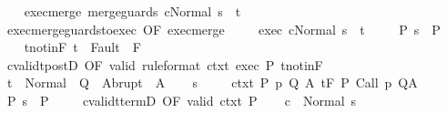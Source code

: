 \begin{isabellebody}
\ \ \isamarkupfalse%
\ exec{\isacharunderscore}merge{\isacharcolon}\ {\isachardoublequoteopen}{\isasymGamma}{\isasymturnstile}{\isasymlangle}merge{\isacharunderscore}guards\ c{\isacharcomma}Normal\ s{\isasymrangle}\ {\isasymRightarrow}\ t{\isachardoublequoteclose}\isanewline
\ \ \isamarkupfalse%
\ exec{\isacharunderscore}merge{\isacharunderscore}guards{\isacharunderscore}to{\isacharunderscore}exec\ {\isacharbrackleft}OF\ exec{\isacharunderscore}merge{\isacharbrackright}\ \isanewline
\ \ \isamarkupfalse%
\ exec{\isacharcolon}\ {\isachardoublequoteopen}{\isasymGamma}{\isasymturnstile}{\isasymlangle}c{\isacharcomma}Normal\ s{\isasymrangle}\ {\isasymRightarrow}\ t{\isachardoublequoteclose}\ \isacommand{{\isachardot}}\isamarkupfalse%
\isanewline
\ \ \isamarkupfalse%
\ P{\isacharcolon}\ {\isachardoublequoteopen}s\ {\isasymin}\ P{\isachardoublequoteclose}\ \isanewline
\ \ \isamarkupfalse%
\ t{\isacharunderscore}notin{\isacharunderscore}F{\isacharcolon}\ {\isachardoublequoteopen}t\ {\isasymnotin}\ Fault\ {\isacharbackquote}\ F{\isachardoublequoteclose}\isanewline
\ \ \isamarkupfalse%
\ cvalidt{\isacharunderscore}postD\ {\isacharbrackleft}OF\ valid\ {\isacharbrackleft}rule{\isacharunderscore}format{\isacharbrackright}\ ctxt\ exec\ P\ t{\isacharunderscore}notin{\isacharunderscore}F{\isacharbrackright}\isanewline
\ \ \isamarkupfalse%
\ {\isachardoublequoteopen}t\ {\isasymin}\ Normal\ {\isacharbackquote}\ Q\ {\isasymunion}\ Abrupt\ {\isacharbackquote}\ A{\isachardoublequoteclose}\isacommand{{\isachardot}}\isamarkupfalse%
\isanewline
{}\isamarkupfalse%
\isanewline
\ \ \isamarkupfalse%
\ s\ \isanewline
\ \ \isamarkupfalse%
\ ctxt{\isacharcolon}\ {\isachardoublequoteopen}{\isasymforall}{\isacharparenleft}P{\isacharcomma}\ p{\isacharcomma}\ Q{\isacharcomma}\ A{\isacharparenright}{\isasymin}{\isasymTheta}{\isachardot}\ {\isasymGamma}{\isasymTurnstile}\isactrlsub t\isactrlbsub {\isacharslash}F\isactrlesub \ P\ {\isacharparenleft}Call\ p{\isacharparenright}\ Q{\isacharcomma}A{\isachardoublequoteclose}\ \isanewline
\ \ \isamarkupfalse%
\ P{\isacharcolon}\ {\isachardoublequoteopen}s\ {\isasymin}\ P{\isachardoublequoteclose}\ \isanewline
\ \ \isamarkupfalse%
\ cvalidt{\isacharunderscore}termD\ {\isacharbrackleft}OF\ valid\ ctxt\ P{\isacharbrackright}\isanewline
\ \ \isamarkupfalse%
\ {\isachardoublequoteopen}{\isasymGamma}{\isasymturnstile}c\ {\isasymdown}\ Normal\ s{\isachardoublequoteclose}\isacommand{{\isachardot}}\isamarkupfalse%

\end{isabellebody}
